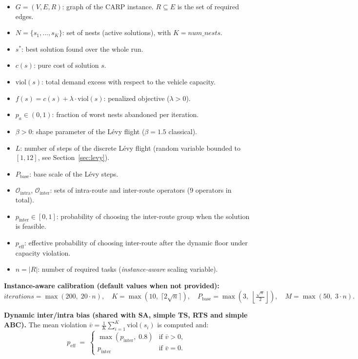 \documentclass[12pt, a4paper]{article}
\begin{document}
\begin{itemize}
    \item $G = (V, E, R)$: graph of the CARP instance. $R \subseteq E$ is the
          set of required edges.
    \item $N = \{s_1, \ldots, s_{K}\}$: set of nests (active solutions),
          with $K = \mathit{num\_nests}$.
    \item $s^{*}$: best solution found over the whole run.
    \item $c(s)$: pure cost of solution $s$.
    \item $\mathrm{viol}(s)$: total demand excess with respect to the vehicle
          capacity.
    \item $f(s) = c(s) + \lambda \cdot \mathrm{viol}(s)$: penalized objective
          ($\lambda > 0$).
    \item $p_a \in (0,1)$: fraction of worst nests abandoned per iteration.
    \item $\beta > 0$: shape parameter of the L\'evy flight ($\beta = 1.5$
          classical).
    \item $L$: number of steps of the discrete L\'evy flight (random variable
          bounded to $[1, 12]$, see Section~\ref{sec:levy}).
    \item $P_{\mathrm{base}}$: base scale of the L\'evy steps.
    \item $\mathcal{O}_{\mathrm{intra}}$, $\mathcal{O}_{\mathrm{inter}}$:
          sets of intra-route and inter-route operators (9 operators in total).
    \item $p_{\mathrm{inter}} \in [0,1]$: probability of choosing the
          inter-route group when the solution is feasible.
    \item $p_{\mathrm{eff}}$: effective probability of choosing inter-route
          after the dynamic floor under capacity violation.
    \item $n = |R|$: number of required tasks (\emph{instance-aware} scaling
          variable).
\end{itemize}

\medskip
\noindent
\textbf{Instance-aware calibration (default values when not provided):}
\[
\mathit{iterations} = \max(200,\; 20 \cdot n), \quad
K = \max(10,\; \lceil 2\sqrt{n} \rceil), \quad
P_{\mathrm{base}} = \max\!\left(3,\; \left\lfloor\tfrac{\sqrt{n}}{2}\right\rfloor\right), \quad
M = \max(50,\; 3 \cdot n).
\]

\medskip
\noindent
\textbf{Dynamic inter/intra bias (shared with SA, simple TS, RTS and simple
ABC).} The mean violation
$\bar{v} = \tfrac{1}{K}\sum_{i=1}^{K}\mathrm{viol}(s_i)$ is computed and:
\[
p_{\mathrm{eff}} \;=\;
\begin{cases}
  \max(p_{\mathrm{inter}},\; 0.8) & \text{if } \bar{v} > 0, \\
  p_{\mathrm{inter}}              & \text{if } \bar{v} = 0.
\end{cases}
\]
\end{document}
